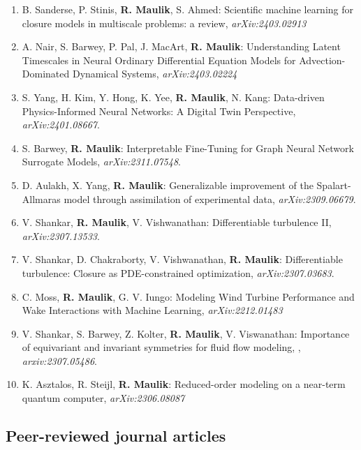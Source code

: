 \documentclass[letterpaper]{article}
\begin{document}
\begin{enumerate}

\item B. Sanderse, P. Stinis, \textbf{R. Maulik}, S. Ahmed: Scientific machine learning for closure models in multiscale problems: a review, {\it arXiv:2403.02913}

\item A. Nair, S. Barwey, P. Pal, J. MacArt, \textbf{R. Maulik}: Understanding Latent Timescales in Neural Ordinary Differential Equation Models for Advection-Dominated Dynamical Systems, {\it arXiv:2403.02224}

\item S. Yang, H. Kim, Y. Hong, K. Yee, \textbf{R. Maulik}, N. Kang:  Data-driven Physics-Informed Neural Networks: A Digital Twin Perspective, {\it arXiv:2401.08667}.

\item S. Barwey, \textbf{R. Maulik}: Interpretable Fine-Tuning for Graph Neural Network Surrogate Models, {\it arXiv:2311.07548}.

\item D. Aulakh, X. Yang, \textbf{R. Maulik}: Generalizable improvement of the Spalart-Allmaras model through assimilation of experimental data, {\it arXiv:2309.06679}.

\item V. Shankar, \textbf{R. Maulik}, V. Vishwanathan: Differentiable turbulence II, {\it arXiv:2307.13533}.

\item V. Shankar, D. Chakraborty, V. Vishwanathan, \textbf{R. Maulik}: Differentiable turbulence: Closure as PDE-constrained optimization, {\it arXiv:2307.03683}.

\item C. Moss, \textbf{R. Maulik}, G. V. Iungo: Modeling Wind Turbine Performance and Wake Interactions with Machine Learning, {\it arXiv:2212.01483}

\item V. Shankar, S. Barwey,  Z. Kolter, \textbf{R. Maulik}, V. Viswanathan: Importance of equivariant and invariant symmetries for fluid flow modeling, , {\it arxiv:2307.05486}.

\item K. Asztalos, R. Steijl, \textbf{R. Maulik}: Reduced-order modeling on a near-term quantum computer, {\it arXiv:2306.08087}

\end{enumerate}


\subsection*{Peer-reviewed journal articles}
\end{document}
